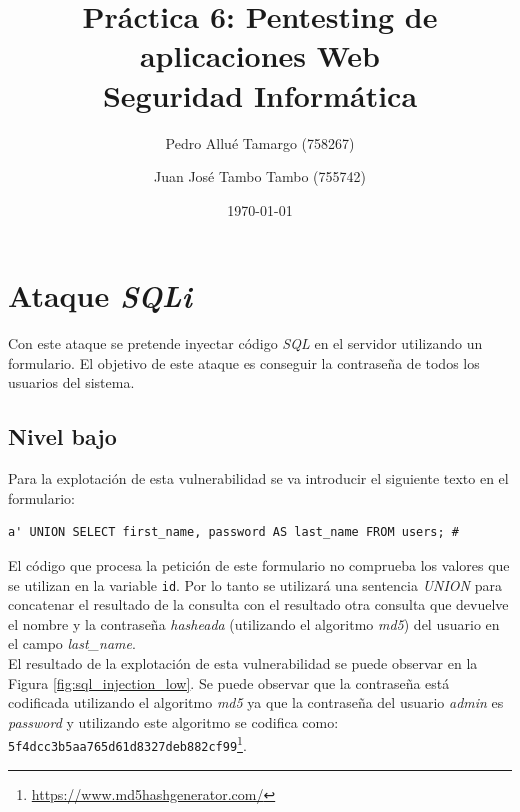 \documentclass{article}
\begin{document}
\begin{titlepage}
\title{\textbf{
    {\Huge Práctica 6: Pentesting de aplicaciones Web}\\
    {\Large Seguridad Informática}
}}
\author{
    Pedro Allué Tamargo (758267)
    \and
    Juan José Tambo Tambo (755742)
}
\date{\today}
\clearpage\maketitle
\thispagestyle{empty}
\tableofcontents
\end{titlepage}


\section{Ataque \textit{SQLi}}

Con este ataque se pretende inyectar código \textit{SQL} en el servidor utilizando un formulario. El objetivo de este ataque es conseguir la contraseña de todos los usuarios del sistema.\\


\subsection{Nivel bajo}

Para la explotación de esta vulnerabilidad se va introducir el siguiente texto en el formulario:

\begin{lstlisting}
a' UNION SELECT first_name, password AS last_name FROM users; #
\end{lstlisting}

El código que procesa la petición de este formulario no comprueba los valores que se utilizan en la variable \texttt{id}. Por lo tanto se utilizará una sentencia \textit{UNION} para concatenar el resultado de la consulta con el resultado otra consulta que devuelve el nombre y la contraseña \textit{hasheada} (utilizando el algoritmo \textit{md5}) del usuario en el campo \textit{last\_{}name}.\\
El resultado de la explotación de esta vulnerabilidad se puede observar en la Figura \ref{fig:sql_injection_low}. Se puede observar que la contraseña está codificada utilizando el algoritmo \textit{md5} ya que la contraseña del usuario \textit{admin} es \textit{password} y utilizando este algoritmo se codifica como: \texttt{5f4dcc3b5aa765d61d8327deb882cf99}\footnote{\url{https://www.md5hashgenerator.com/}}.\\
\end{document}
